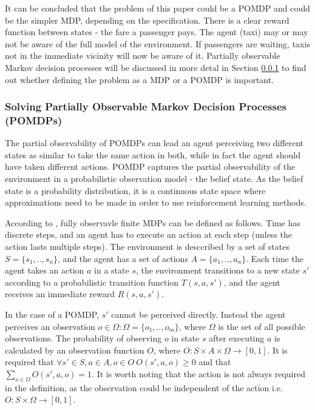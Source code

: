 It can be concluded that the problem of this paper could be a POMDP and could
be the simpler MDP, depending on the specification. There is a clear reward
function between states - the fare a passenger pays. The agent (taxi) may or
may not be aware of the full model of the environment. If passengers are
waiting, taxis not in the immediate vicinity will now be aware of it. Partially
observable Markov decision processes will be discussed in more detal in Section
\ref{sec:ai:pomdp} to find out whether defining the problem as a MDP or a POMDP is important.

\subsubsection{Solving Partially Observable Markov Decision Processes (POMDPs)}
\label{sec:ai:pomdp}

The partial observability of POMDPs can lead an agent perceiving two different
states as similar to take the same action in both, while in fact the agent
should have taken different actions. POMDP captures the partial observability
of the environment in a probabilistic observation model - the belief state. As
the belief state is a probability distribution, it is a continuous state space
where approximations need to be made in order to use reinforcement learning
methods. \parencite{Russell2010ai+modern}

According to \textcite{Spaan2012ai+pomdp}, fully observavle finite MDPs can be
defined as follows. Time has discrete steps, and an agent has to execute an
action at each step (unless the action lasts multiple steps). The environment
is desccribed by a set of states \(S = \{s_1,..,s_n\}\), and the agent has a
set of actions \(A = \{a_1,..,a_n\}\). Each time the agent takes an action
\(a\) in a state \(s\), the environment transitions to a new state \(s'\)
according to a probabilistic transition function \(T(s,a,s')\), and the agent
receives an immediate reward \(R(s,a,s')\).

In the case of a POMDP, \(s'\) cannot be perceived directly. Instead the agent
perceives an observation \(o \in \Omega : \Omega = \{o_1,..,o_m\}\), where
\(\Omega\) is the set of all possible observations. The probability of
observing \(o\) in state \(s\) after executing \(a\) is calculated by an
observation function \(O\), where \(O : S \times A \times \Omega \rightarrow
[0,1] \). It is required that \(\forall s' \in S, a \in A, o \in O ~ O (s', a,
o) \geq 0 \) and that \(\sum_{o \in \Omega}^{} O (s', a, o) = 1 \). It is worth
noting that the action is not always required in the definition, as the
observation could be independent of the action i.e. \(O : S \times \Omega
\rightarrow [0,1] \). \parencite{Spaan2012ai+pomdp}


